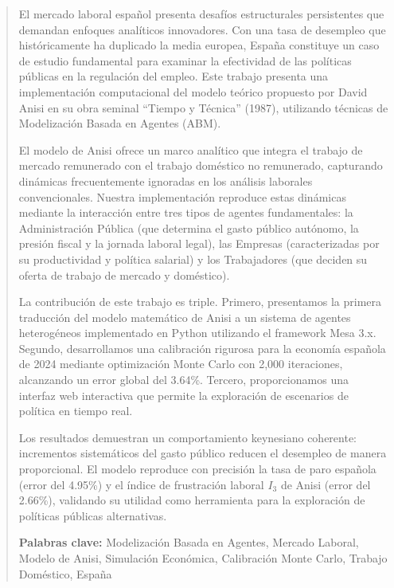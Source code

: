 \begin{abstract}
El mercado laboral español presenta desafíos estructurales persistentes que demandan enfoques analíticos innovadores. Con una tasa de desempleo que históricamente ha duplicado la media europea, España constituye un caso de estudio fundamental para examinar la efectividad de las políticas públicas en la regulación del empleo. Este trabajo presenta una implementación computacional del modelo teórico propuesto por David Anisi en su obra seminal ``Tiempo y Técnica'' (1987), utilizando técnicas de Modelización Basada en Agentes (ABM).

El modelo de Anisi ofrece un marco analítico que integra el trabajo de mercado remunerado con el trabajo doméstico no remunerado, capturando dinámicas frecuentemente ignoradas en los análisis laborales convencionales. Nuestra implementación reproduce estas dinámicas mediante la interacción entre tres tipos de agentes fundamentales: la Administración Pública (que determina el gasto público autónomo, la presión fiscal y la jornada laboral legal), las Empresas (caracterizadas por su productividad y política salarial) y los Trabajadores (que deciden su oferta de trabajo de mercado y doméstico).

La contribución de este trabajo es triple. Primero, presentamos la primera traducción del modelo matemático de Anisi a un sistema de agentes heterogéneos implementado en Python utilizando el framework Mesa 3.x. Segundo, desarrollamos una calibración rigurosa para la economía española de 2024 mediante optimización Monte Carlo con 2,000 iteraciones, alcanzando un error global del 3.64\%. Tercero, proporcionamos una interfaz web interactiva que permite la exploración de escenarios de política en tiempo real.

Los resultados demuestran un comportamiento keynesiano coherente: incrementos sistemáticos del gasto público reducen el desempleo de manera proporcional. El modelo reproduce con precisión la tasa de paro española (error del 4.95\%) y el índice de frustración laboral $I_3$ de Anisi (error del 2.66\%), validando su utilidad como herramienta para la exploración de políticas públicas alternativas.

\textbf{Palabras clave:} Modelización Basada en Agentes, Mercado Laboral, Modelo de Anisi, Simulación Económica, Calibración Monte Carlo, Trabajo Doméstico, España
\end{abstract}
